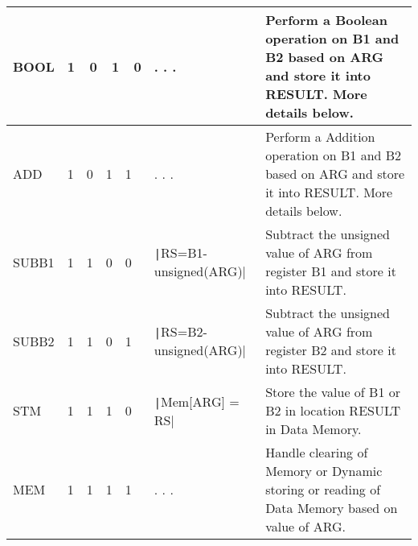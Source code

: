 \documentclass[12pt,journal,compsoc]{article}
\begin{document}
\begin{center}
{\begin{tabular}{ | p{3.0cm} | m{2.05cm} | p{5.0cm} | p{12.0cm} | }
  \hline 
  BOOL  & 1~~0~~1~~0 & . . . & Perform a Boolean operation on B1 and B2 based on ARG and store it into RESULT. More details below. \\
  \hline 
  ADD   & 1~~0~~1~~1 & . . . & Perform a Addition operation on B1 and B2 based on ARG and store it into RESULT. More details below. \\
  \hline 
  SUBB1 & 1~~1~~0~~0 & \texttt|RS=B1-unsigned(ARG)| & Subtract the unsigned value of ARG from register B1 and store it into RESULT. \\
  \hline 
  SUBB2 & 1~~1~~0~~1 & \texttt|RS=B2-unsigned(ARG)| & Subtract the unsigned value of ARG from register B2 and store it into RESULT. \\
  \hline 
  STM   & 1~~1~~1~~0 & \texttt|Mem[ARG] = RS| & Store the value of B1 or B2 in location RESULT in Data Memory. \\
  \hline 
  MEM   & 1~~1~~1~~1 & . . . & Handle clearing of Memory or Dynamic storing or reading of Data Memory based on value of ARG. \\
  \hline
\end{tabular}}

~~~~~~~~~~~~



\end{center}
\end{document}
